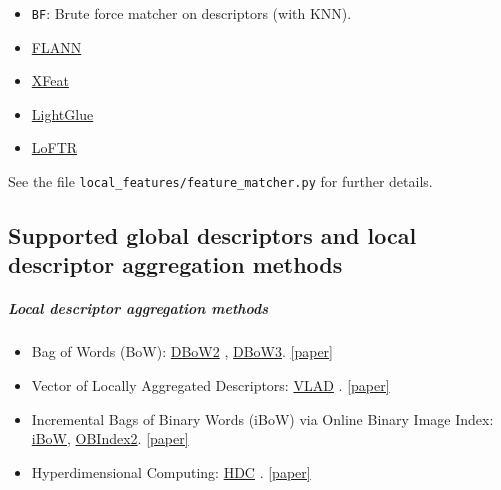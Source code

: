 \documentclass{article}
\let\oldsubparagraph\subparagraph
\renewcommand{\subparagraph}[1]{\oldsubparagraph{#1}\mbox{}}
\begin{document}
\begin{itemize}
    \item \texttt{BF}: Brute force matcher on descriptors (with KNN).
    \item \href{https://www.semanticscholar.org/paper/Fast-Approximate-Nearest-Neighbors-with-Automatic-Muja-Lowe/35d81066cb1369acf4b6c5117fcbb862be2af350}{FLANN} \cite{muja2009fast}
    \item \href{https://arxiv.org/abs/2404.19174}{XFeat} \cite{barroso2024xfeat}
    \item \href{https://arxiv.org/abs/2306.13643}{LightGlue}
    \item \href{https://arxiv.org/abs/2104.00680}{LoFTR}
\end{itemize}

See the file \texttt{local\_features/feature\_matcher.py} for further
details.

\hypertarget{supported-global-descriptors-and-local-descriptor-aggregation-methods}{%
\subsection{Supported global descriptors and local descriptor
aggregation
methods}\label{supported-global-descriptors-and-local-descriptor-aggregation-methods}}

\hypertarget{local-descriptor-aggregation-methods}{%
\subparagraph{Local descriptor aggregation
methods}\label{local-descriptor-aggregation-methods}}

\begin{itemize}
    \item Bag of Words (BoW): \href{https://github.com/dorian3d/DBoW2}{DBoW2} \cite{galvez2012bags}, \href{https://github.com/rmsalinas/DBow3}{DBoW3}.  \href{https://doi.org/10.1109/TRO.2012.2197158}{[paper]}
    \item Vector of Locally Aggregated Descriptors: \href{https://www.vlfeat.org/api/vlad.html}{VLAD} \cite{arandjelovic2016netvlad}.  \href{https://doi.org/10.1109/CVPR.2010.5540039}{[paper]}
    \item Incremental Bags of Binary Words (iBoW) via Online Binary Image Index: \href{https://github.com/emiliofidalgo/ibow-lcd}{iBoW}, \href{https://github.com/emiliofidalgo/obindex2}{OBIndex2}.  \href{https://doi.org/10.1109/LRA.2018.2849609}{[paper]}
    \item Hyperdimensional Computing: \href{https://www.tu-chemnitz.de/etit/proaut/hdc_desc}{HDC} \cite{neubert2021hyperdimensional}.  \href{https://openaccess.thecvf.com/content/CVPR2021/html/Neubert_Hyperdimensional_Computing_as_a_Framework_for_Systematic_Aggregation_of_Image_CVPR_2021_paper.html}{[paper]}
\end{itemize}
\end{document}
